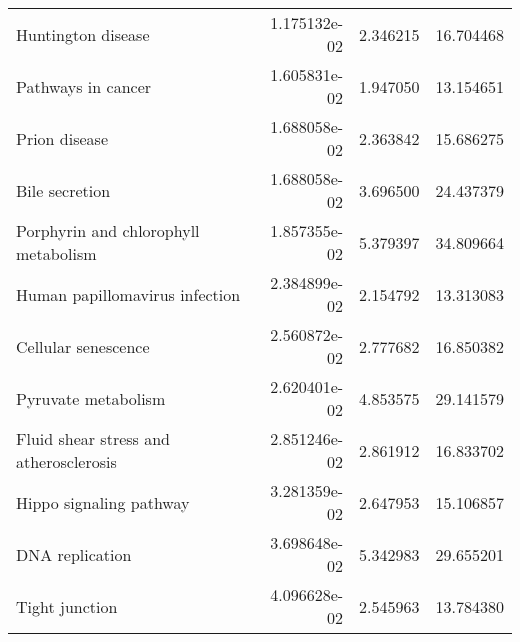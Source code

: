 \begin{tabular}{lrrr}
                          Huntington disease &      1.175132e-02 &  2.346215 &       16.704468 \\
                          Pathways in cancer &      1.605831e-02 &  1.947050 &       13.154651 \\
                               Prion disease &      1.688058e-02 &  2.363842 &       15.686275 \\
                              Bile secretion &      1.688058e-02 &  3.696500 &       24.437379 \\
        Porphyrin and chlorophyll metabolism &      1.857355e-02 &  5.379397 &       34.809664 \\
              Human papillomavirus infection &      2.384899e-02 &  2.154792 &       13.313083 \\
                         Cellular senescence &      2.560872e-02 &  2.777682 &       16.850382 \\
                         Pyruvate metabolism &      2.620401e-02 &  4.853575 &       29.141579 \\
      Fluid shear stress and atherosclerosis &      2.851246e-02 &  2.861912 &       16.833702 \\
                     Hippo signaling pathway &      3.281359e-02 &  2.647953 &       15.106857 \\
                             DNA replication &      3.698648e-02 &  5.342983 &       29.655201 \\
                              Tight junction &      4.096628e-02 &  2.545963 &       13.784380 \\
\bottomrule
\end{tabular}
